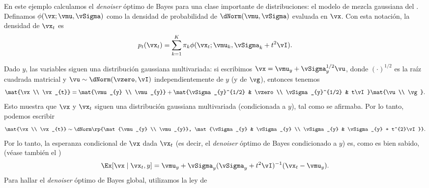 \documentclass[../../book-main.tex]{subfiles}
\begin{document}
\begin{example}\label{example:denoising_gaussian_mixture}
    En este ejemplo calculamos el \textit{denoiser} óptimo de Bayes para una
    clase importante de distribuciones: el modelo de mezcla gaussiana
    del . Definamos \(\phi(\vx ;
    \vmu, \vSigma)\) como la densidad de probabilidad de \(\dNorm(\vmu,
    \vSigma)\) evaluada en \(\vx\). Con esta notación, la densidad de
    \(\vx_{t}\) es
    \begin{equation}
        p_{t}(\vx_{t}) = \sum_{k = 1}^{K}\pi_{k}\phi(\vx_{t} ;
        \vmu_{k}, \vSigma_{k} + t^{2}\vI).
    \end{equation}

    Dado \(y\), las variables siguen una distribución gaussiana multivariada: si
    escribimos \(\vx = \vmu_{y} + \vSigma_{y}^{1/2}\vu\), donde
    \((\cdot)^{1/2}\) es la raíz cuadrada matricial y \(\vu \sim
    \dNorm(\vzero, \vI)\) independientemente de \(y\) (y de \(\vg\)), entonces tenemos
    \begin{equation}
        \mat{\vx \\ \vx_{t}} = \mat{\vmu_{y} \\ \vmu_{y}} +
        \mat{\vSigma_{y}^{1/2} & \vzero \\ \vSigma_{y}^{1/2} &
        t\vI}\mat{\vu \\ \vg}.
    \end{equation}
    Esto muestra que \(\vx\) y \(\vx_{t}\) siguen una distribución gaussiana multivariada
    (condicionada a \(y\)), tal como se afirmaba. Por lo tanto, podemos escribir
    \begin{equation}
        \mat{\vx \\ \vx_{t}} \sim \dNorm\rp{\mat{\vmu_{y}
            \\ \vmu_{y}}, \mat{\vSigma_{y} & \vSigma_{y} \\ \vSigma_{y} &
        \vSigma_{y} + t^{2}\vI}}.
    \end{equation}
    Por lo tanto, la esperanza condicional de \(\vx\) dada \(\vx_{t}\) (es decir, el
    \textit{denoiser} óptimo de Bayes condicionado a \(y\)) es, como es bien sabido,
    (véase también el )
    \begin{equation}
        \Ex[\vx \mid \vx_{t}, y] = \vmu_{y} + \vSigma_{y}(\vSigma_{y}
        + t^{2}\vI)^{-1}(\vx_{t} - \vmu_{y}).
    \end{equation}
    Para hallar el \textit{denoiser} óptimo de Bayes global, utilizamos la ley de

\end{example}
\end{document}
